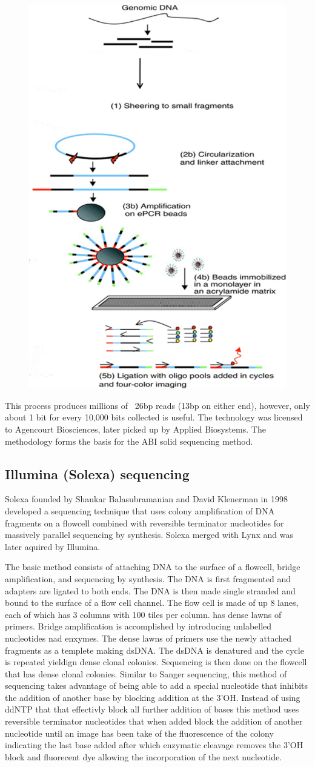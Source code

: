 \documentclass{report}\usepackage[]{graphicx}\usepackage[]{color}
\begin{document}
\begin{figure}[H]
\centering
    \includegraphics[width=.3\textwidth]{images/Polony.pdf}
    \caption{}\label{fig:Polony} 
\end{figure}

This process produces millions of ~26bp reads (13bp on either end), however, only about 1 bit 
for every 10,000 bits collected is useful. The technology was licensed to Agencourt Biosciences, later 
picked up by Applied Biosystems. The methodology forms the basis for the ABI solid sequencing method.

\subsection*{Illumina (Solexa) sequencing}
Solexa founded by Shankar Balasubramanian and David Klenerman in 1998 developed a sequencing technique
that uses colony amplification of DNA fragments on a flowcell combined with reversible terminator nucleotides 
for massively parallel sequencing by synthesis. Solexa merged with Lynx and was later aquired by Illumina. 

The basic method consists of attaching DNA to the surface of a flowcell, bridge amplification, and sequencing 
by synthesis. The DNA is first fragmented and adapters are ligated to both ends. The DNA is then made single 
stranded and bound to the surface of a flow cell channel. The flow cell is made of up 8 lanes, each of which 
has 3 columns with 100 tiles per column. has dense lawns of primers. Bridge amplification
is accomplished by introducing unlabelled nucleotides nad enxymes. The dense lawns of primers use the newly 
attached fragments as a templete making dsDNA. The dsDNA is denatured and the cycle is repeated yieldign dense
clonal colonies. Sequencing is then done on the flowcell that has dense clonal colonies. Similar to Sanger sequencing, 
this method of sequencing takes advantage of being able to add a special nucleotide that inhibits the addition of another
base by blocking addition at the 3'OH. Instead of using ddNTP that that effectivly block all further addition of bases
this method uses reversible terminator nucleotides that when added block the addition of another nucleotide until
an image has been take of the fluorescence of the colony indicating the last base added after which 
enzymatic cleavage removes the 3'OH block and fluorecent dye allowing the incorporation of the next nucleotide.  
\end{document}
